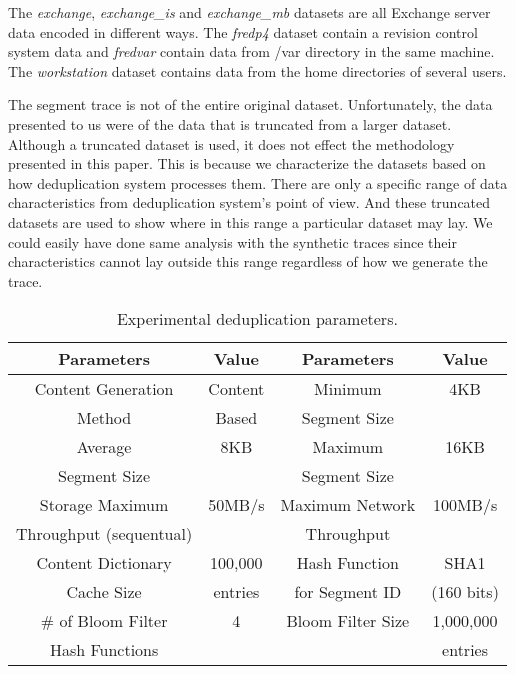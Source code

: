 The \emph{exchange}, \emph{exchange\_is} and \emph{exchange\_mb} datasets are all Exchange server data encoded in different ways. The \emph{fredp4} dataset contain a revision control system data and \emph{fredvar} contain data from /var directory in the same machine. The \emph{workstation} dataset contains data from the home directories of several users.  

The segment trace is not of the entire original dataset. Unfortunately, the data presented to us were of the data that is truncated from a larger dataset. Although a truncated dataset is used, it does not effect the methodology presented in this paper. This is because we characterize the datasets based on how deduplication system processes them. There are only a specific range of data characteristics from deduplication system's point of view. And these truncated datasets are used to show where in this range a particular dataset may lay. We could easily have done same analysis with the synthetic traces since their characteristics cannot lay outside this range regardless of how we generate the trace. 

\begin{table}[!t]
\renewcommand{\arraystretch}{1.3}
\caption{Experimental deduplication parameters.}
\label{ex_t}
\centering
\begin{tabular}{c|c|| c| c}
\hline
\bfseries Parameters 	&\bfseries Value		&\bfseries Parameters 	&\bfseries Value		\\
\hline\hline
Content Generation	&Content			&Minimum 			&4KB				\\
Method			&Based			&Segment Size		&				\\
\hline
Average			&8KB				&Maximum			&16KB			\\
Segment Size		&				&Segment Size		&				\\
\hline
Storage Maximum	 	&50MB/s 			&Maximum Network	&100MB/s			\\
Throughput (sequentual)	& 				&Throughput		&				\\
\hline
Content Dictionary		&100,000			&Hash Function		&SHA1			\\
Cache Size			&entries			&for Segment ID		&(160 bits)			\\
\hline
\# of Bloom Filter 		&4				&Bloom Filter Size		&1,000,000			\\
Hash Functions 		&				&				&entries			\\
\hline
\end{tabular}
\end{table}

